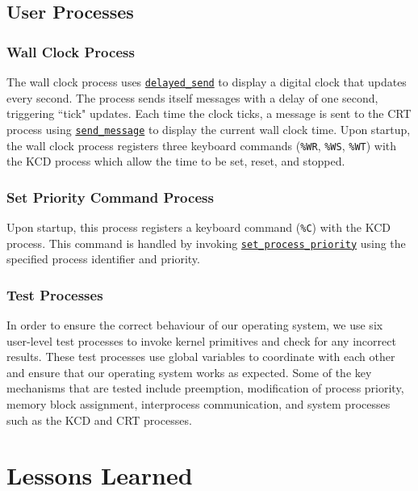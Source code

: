 \documentclass[12pt]{report}
\begin{document}
\section{User Processes}

\subsection{Wall Clock Process}

The wall clock process uses \hyperref[alg:sendingdelayedmessages]{\texttt{delayed_send}} to display a digital clock that updates every second. The process sends itself messages with a delay of one second,
triggering ``tick" updates. Each time the clock ticks, a message is sent to the CRT process using \hyperref[alg:sendingmessages]{\texttt{send_message}} to display the current wall clock time. Upon startup, the wall clock process registers three keyboard commands (\texttt{\%WR}, \texttt{\%WS}, \texttt{\%WT}) with the KCD process which allow the time to be set, reset, and stopped.

\subsection{Set Priority Command Process}

Upon startup, this process registers a keyboard command (\texttt{\%C}) with the KCD process. This command is handled by invoking \hyperref[alg:processpriority]{\texttt{set_process_priority}} using the specified process identifier and priority.

\subsection{Test Processes}

In order to ensure the correct behaviour of our operating system, we use six user-­level test processes to invoke kernel primitives and check for any incorrect results. These test processes use global variables to coordinate with each other and ensure that  our operating system works as expected. Some of the key mechanisms that are tested include preemption, modification of process priority, memory block assignment, interprocess communication, and system processes such as the KCD and CRT processes.

\chapter{Lessons Learned}
\end{document}
